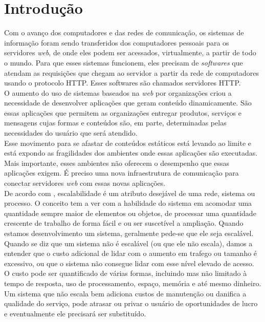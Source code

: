 \chapter{Introdução}\label{introducao}
Com o avanço dos computadores e das redes de comunicação, os sistemas de 
informação foram sendo transferidos dos computadores pessoais para os 
servidores \textit{web}, de onde eles podem ser acessados, virtualmente, a 
partir de todo o mundo. Para que esses sistemas funcionem, eles precisam de 
\textit{softwares} que atendam as requisições que chegam ao servidor a partir 
da rede de computadores usando o protocolo HTTP. Esses softwares são chamados 
servidores HTTP.\\
O aumento do uso de sistemas baseados na \textit{web} por organizações criou a 
necessidade de desenvolver aplicações que geram conteúdo dinamicamente. São 
essas aplicações que permitem as organizações entregar produtos, serviços e 
mensagens cujas formas e conteúdos são, em parte, determinadas pelas 
necessidades do usuário que será atendido.\\
Esse movimento para se afastar de conteúdos estáticos está levando ao limite e 
está expondo as fragilidades dos ambientes onde essas aplicações são 
executadas. Mais importante, esses ambientes não oferecem o desempenho que 
essas aplicações exigem. É preciso uma nova infraestrutura de comunicação para 
conectar servidores \textit{web} com essas novas aplicações.\\
De acordo com , escalabilidade é um atributo desejável de 
uma rede, sistema ou processo. O conceito tem a ver com a habilidade do sistema 
em acomodar uma quantidade sempre maior de elementos ou objetos, de processar 
uma quantidade crescente de trabalho de forma fácil e ou ser suscetível a 
ampliação. Quando estamos desenvolvimento um sistema, geralmente pede-se que 
ele seja escalável.\\
Quando se diz que um sistema não é escalável (ou que ele não escala), damos a 
entender que o custo adicional de lidar com o aumento em trafego ou tamanho é 
excessivo, ou que o sistema não consegue lidar com esse nível elevado de 
acesso. O custo pode ser quantificado de várias formas, incluindo mas não 
limitado à tempo de resposta, uso de processamento, espaço, memória e até mesmo 
dinheiro. Um sistema que não escala bem adiciona custos de manutenção ou 
danifica a qualidade do serviço, pode atrasar ou privar o usuário de 
oportunidades de lucro e eventualmente ele precisará ser substituído.\\
